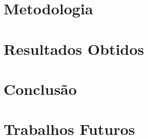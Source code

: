 \documentclass{vgtc}                          %
\begin{document}
\section{Metodologia}


\section{Resultados Obtidos}



\section{Conclusão}


\section{Trabalhos Futuros}



\end{document}
